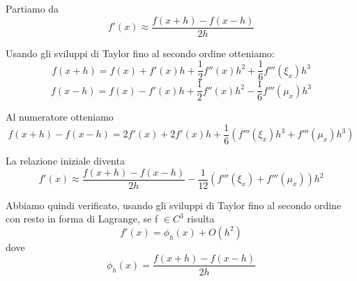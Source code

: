 Partiamo da
\[f'(x) \approx \frac{f(x+h) - f(x-h)}{2h}\]

Usando gli sviluppi di Taylor fino al secondo ordine otteniamo:
\[f(x+h) = f(x) + f'(x)h + \frac{1}{2} f''(x)h^{2} + \frac{1}{6}f'''(\xi_x)h^{3}\]
\[f(x-h) = f(x) - f'(x)h + \frac{1}{2} f''(x)h^{2} - \frac{1}{6}f'''(\mu_x)h^{3}\]

Al numeratore otteniamo
\[f(x+h) - f(x-h) = 2f'(x) + 2f'(x)h + \frac{1}{6}(f'''(\xi_x)h^{3}+f'''(\mu_x)h^{3})\]

La relazione iniziale diventa
\[f'(x) \approx \frac{f(x+h) - f(x-h)}{2h} - \frac{1}{12}(f'''(\xi_x) + f'''(\mu_x))h^{2}\]

Abbiamo quindi verificato, usando gli sviluppi di Taylor fino al secondo ordine con resto in forma di Lagrange, se f $\in C^{3}$ risulta
\[f'(x) = \phi_h(x) + O(h^2)\]
dove
\[\phi_h(x) = \frac{f(x+h) - f(x-h)}{2h}\]